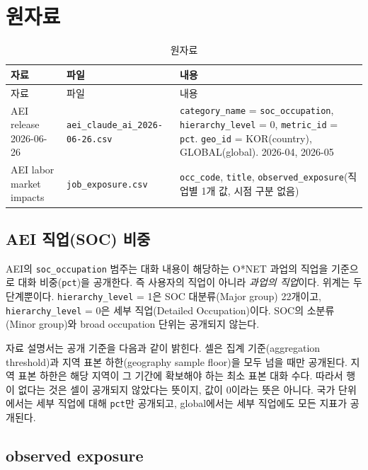 \documentclass[11pt]{article}
\begin{document}
\section{원자료}

\begin{longtable}{L{3.4cm}L{5.0cm}L{7.4cm}}
\caption{원자료}\label{tab:raw}\\
\toprule
자료 & 파일 & 내용 \\
\midrule
\endfirsthead
\toprule
자료 & 파일 & 내용 \\
\midrule
\endhead
AEI release 2026-06-26 & \texttt{aei\_claude\_ai\_2026-06-26.csv} & \texttt{category\_name} = \texttt{soc\_occupation}, \texttt{hierarchy\_level} = 0, \texttt{metric\_id} = \texttt{pct}. \texttt{geo\_id} = KOR(country), GLOBAL(global). 2026-04, 2026-05 \\
AEI labor market impacts & \texttt{job\_exposure.csv} & \texttt{occ\_code}, \texttt{title}, \texttt{observed\_exposure}(직업별 1개 값, 시점 구분 없음) \\
\bottomrule
\end{longtable}

\subsection{AEI 직업(SOC) 비중}

AEI의 \texttt{soc\_occupation} 범주는 대화 내용이 해당하는 O*NET 과업의 직업을 기준으로 대화 비중(\texttt{pct})을 공개한다. 즉 사용자의 직업이 아니라 \emph{과업의 직업}이다. 위계는 두 단계뿐이다. \texttt{hierarchy\_level} = 1은 SOC 대분류(Major group) 22개이고, \texttt{hierarchy\_level} = 0은 세부 직업(Detailed Occupation)이다. SOC의 소분류(Minor group)와 broad occupation 단위는 공개되지 않는다.

자료 설명서는 공개 기준을 다음과 같이 밝힌다. 셀은 집계 기준(aggregation threshold)과 지역 표본 하한(geography sample floor)을 모두 넘을 때만 공개된다. 지역 표본 하한은 해당 지역이 그 기간에 확보해야 하는 최소 표본 대화 수다. 따라서 행이 없다는 것은 셀이 공개되지 않았다는 뜻이지, 값이 0이라는 뜻은 아니다. 국가 단위에서는 세부 직업에 대해 \texttt{pct}만 공개되고, global에서는 세부 직업에도 모든 지표가 공개된다.

\subsection{observed exposure}
\end{document}

